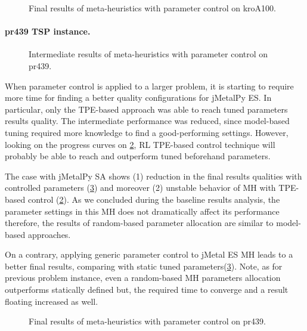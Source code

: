
\begin{figure}[b]
	\centering
	
	\caption{Final results of meta-heuristics with parameter control on kroA100.}
	\label{eval:pict:pc:kroA100 final}
\end{figure}

\newpage
\paragraph{pr439 TSP instance.}
\begin{figure}[t]
	\centering
	
	\caption{Intermediate results of meta-heuristics with parameter control on pr439.}
	\label{eval:pict:pc:pr439 intermediate}
\end{figure}

When parameter control is applied to a larger problem, it is starting to require more time for finding a better quality configurations for jMetalPy ES. In particular, only the TPE-based approach was able to reach tuned parameters results quality. The intermediate performance was reduced, since model-based tuning required more knowledge to find a good-performing settings. However, looking on the progress curves on \cref{eval:pict:pc:pr439 intermediate}, RL TPE-based control technique will probably be able to reach and outperform tuned beforehand parameters.

The case with jMetalPy SA shows (1) reduction in the final results qualities with controlled parameters (\cref{eval:pict:pc:pr439 final}) and moreover (2) unstable behavior of MH with TPE-based control (\cref{eval:pict:pc:pr439 intermediate}). As we concluded during the baseline results analysis, the parameter settings in this MH does not dramatically affect its performance therefore, the results of random-based parameter allocation are similar to model-based approaches.

On a contrary, applying generic parameter control to jMetal ES MH leads to a better final results, comparing with static tuned parameters(\cref{eval:pict:pc:pr439 final}). Note, as for previous problem instance, even a random-based MH parameters allocation outperforms statically defined but, the required time to converge and a result floating increased as well. 
\begin{figure}[b]
	\centering
	
	\caption{Final results of meta-heuristics with parameter control on pr439.}
	\label{eval:pict:pc:pr439 final}
\end{figure}


